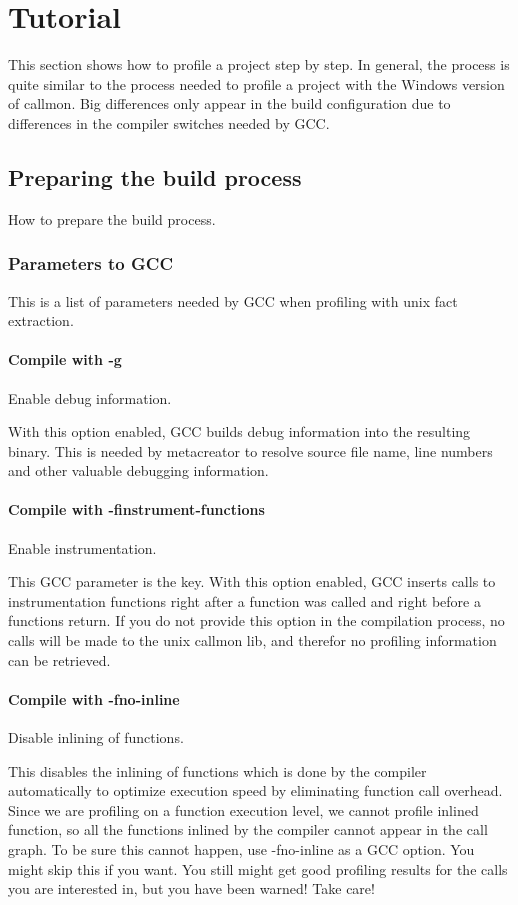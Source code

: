 \section{Tutorial}
\label{sec:Tutorial}
This section shows how to profile a project step by step. In general, the process is quite similar to the process needed to profile a project with the Windows version of callmon. Big differences only appear in the build configuration due to differences in the compiler switches needed by GCC.

\subsection{Preparing the build process} How to prepare the build process.

\subsubsection{Parameters to GCC} This is a list of parameters needed by GCC when profiling with unix fact extraction.

\paragraph{Compile with -g} Enable debug information.

With this option enabled, GCC builds debug information into the resulting binary. This is needed by metacreator to resolve source file name, line numbers and other valuable debugging information.

\paragraph{Compile with -finstrument-functions} Enable instrumentation.

This GCC parameter is the key. With this option enabled, GCC inserts calls to instrumentation functions right after a function was called and right before a functions return. If you do not provide this option in the compilation process, no calls will be made to the unix callmon lib, and therefor no profiling information can be retrieved.

\paragraph{Compile with -fno-inline} Disable inlining of functions.

This disables the inlining of functions which is done by the compiler automatically to optimize execution speed by eliminating function call overhead. Since we are profiling on a function execution level, we cannot profile inlined function, so all the functions inlined by the compiler cannot appear in the call graph. To be sure this cannot happen, use -fno-inline as a GCC option. You might skip this if you want. You still might get good profiling results for the calls you are interested in, but you have been warned! Take care!

